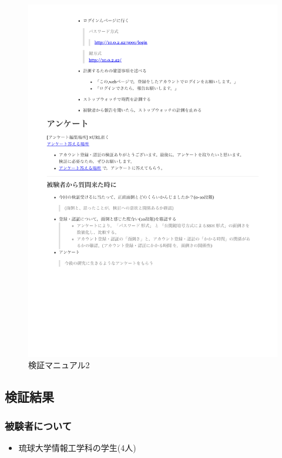 \vspace{4cm}%
 \begin{figure}[H]
     \includegraphics[width=15cm]{./fig/chapter4/inspect_1/manual/manual_2.pdf}
     \caption{検証マニュアル2}
     \label{検証マニュアル２}
 \end{figure}

 \subsection{検証結果}

    \subsubsection{被験者について}
    \begin{itemize}
        \item 琉球大学情報工学科の学生(4人)
    \end{itemize}



